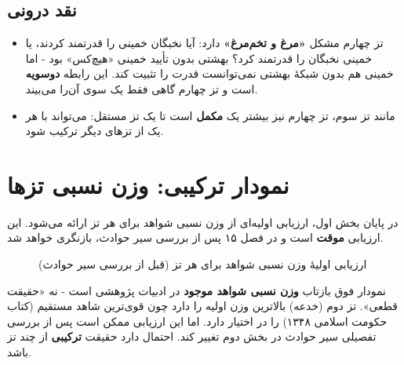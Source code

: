 \documentclass[12pt,a4paper]{book}
\newcommand{\keyword}[1]{\textbf{\textcolor{cPrimary}{#1}}}
\begin{document}
\subsection{نقد درونی}

\begin{itemize}[label=\textcolor{cConsolid}{$\times$}, rightmargin=2em]
    \item تز چهارم مشکل \keyword{«مرغ و تخم‌مرغ»} دارد: آیا نخبگان خمینی را قدرتمند کردند، یا خمینی نخبگان را قدرتمند کرد؟ بهشتی بدون تأیید خمینی «هیچ‌کس» بود - اما خمینی هم بدون شبکهٔ بهشتی نمی‌توانست قدرت را تثبیت کند. این رابطه \keyword{دوسویه} است و تز چهارم گاهی فقط یک سوی آن‌را می‌بیند.
    \item مانند تز سوم، تز چهارم نیز بیشتر یک \keyword{مکمل} است تا یک تز مستقل: می‌تواند با هر یک از تزهای دیگر ترکیب شود.
\end{itemize}

\section{نمودار ترکیبی: وزن نسبی تزها}

در پایان بخش اول، ارزیابی اولیه‌ای از وزن نسبی شواهد برای هر تز ارائه می‌شود. این ارزیابی \keyword{موقت} است و در فصل ۱۵ پس از بررسی سیر حوادث، بازنگری خواهد شد.

\begin{figure}[H]
\centering
{}
\caption{ارزیابی اولیهٔ وزن نسبی شواهد برای هر تز (قبل از بررسی سیر حوادث)}
\label{fig:thesis-weights-preliminary}
\end{figure}

\begin{noteBox}
نمودار فوق بازتاب \keyword{وزن نسبی شواهد موجود} در ادبیات پژوهشی است - نه «حقیقت قطعی». تز دوم (خدعه) بالاترین وزن اولیه را دارد چون قوی‌ترین شاهد مستقیم (کتاب حکومت اسلامی ۱۳۴۸) را در اختیار دارد. اما این ارزیابی ممکن است پس از بررسی تفصیلی سیر حوادث در بخش دوم تغییر کند. احتمال دارد حقیقت \keyword{ترکیبی} از چند تز باشد.
\end{noteBox}
\end{document}

